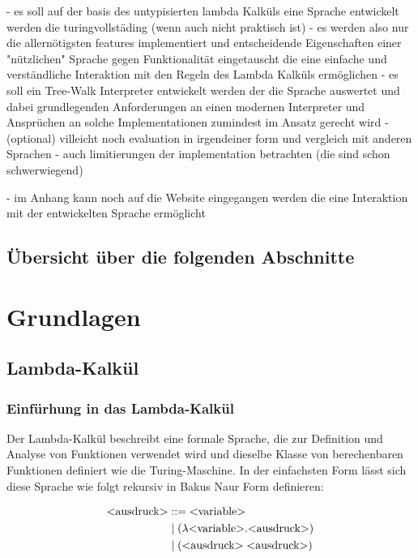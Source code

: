 \documentclass{article}
\begin{document}
- es soll auf der basis des untypisierten lambda Kalküls eine Sprache entwickelt werden die turingvollstäding (wenn auch nicht praktisch ist)
    - es werden also nur die allernötigsten features implementiert und entscheidende Eigenschaften einer "nützlichen" Sprache gegen Funktionalität eingetauscht die eine einfache und verständliche Interaktion mit den Regeln des Lambda Kalküls ermöglichen
- es soll ein Tree-Walk Interpreter entwickelt werden der die Sprache auswertet und dabei grundlegenden Anforderungen an einen modernen Interpreter und Ansprüchen an solche Implementationen zumindest im Ansatz gerecht wird 
- (optional) villeicht noch evaluation in irgendeiner form und vergleich mit anderen Sprachen 
- auch limitierungen der implementation betrachten (die sind schon schwerwiegend)

- im Anhang kann noch auf die Website eingegangen werden die eine Interaktion mit der entwickelten Sprache ermöglicht

\subsection{Übersicht über die folgenden Abschnitte}

\section{Grundlagen}

\subsection{Lambda-Kalkül}

\subsubsection{Einfürhung in das Lambda-Kalkül}

Der Lambda-Kalkül beschreibt eine formale Sprache, die zur Definition und Analyse von Funktionen verwendet wird und dieselbe Klasse von berechenbaren Funktionen definiert wie die Turing-Maschine.
In der einfachsten Form lässt sich diese Sprache wie folgt rekursiv in Bakus Naur Form definieren:

\begin{align*}
    \text{\textless ausdruck\textgreater} & ::= \text{\textless variable\textgreater} \\
                      & \; | \; ( \lambda \text{\textless variable\textgreater} . \text{\textless ausdruck\textgreater} )\\
                      & \; | \; (\text{\textless ausdruck\textgreater} \; \text{\textless ausdruck\textgreater})
\end{align*}
\end{document}
